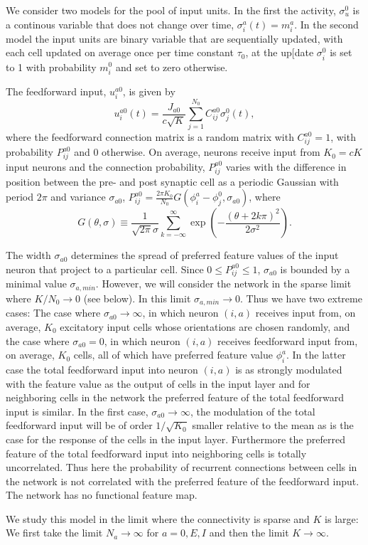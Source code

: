 We consider two models for the pool of input units. In the first the activity,
$\sigma_u^0$ is a continous variable that does not change over time, 
$\sigma_i^a(t)=m_i^a$\@. In the second model the input units are binary 
variable that are sequentially updated, with each cell updated on average once 
per time constant $\tau_0$, at the up[date $\sigma_i^0$ is set to 1 with 
probability $m_i^0$ and set to zero otherwise.

The feedforward input, $u_i^{a0}$, is given by
\begin{equation}
u_i^{a0}(t)=\frac{J_{a0}}{c\sqrt{K}}\sum_{j=1}^{N_0}C_{ij}^{a0}\sigma_j^0(t),
\end{equation}
where the feedforward connection matrix is a random matrix with $C_{ij}^{a0}=1$,
with probability $P_{ij}^{a0}$ and 0 otherwise. On average, neurons receive
input from $K_0=cK$ input neurons and the connection probability,
$P_{ij}^{a0}$ varies with the difference in position between the pre- and
post synaptic cell as a periodic Gaussian with period $2\pi$ and variance
$\sigma_{a0}$, 
$P_{ij}^{a0}=\frac{2\pi K_0}{N_0}G(\phi_i^a-\phi_j^0,\sigma_{a0})$, 
where 
\begin{equation}
G(\theta,\sigma)\equiv\frac{1}{\sqrt{2\pi}\sigma}
\sum_{k=-\infty}^{\infty}\exp\left(-\frac{(\theta+2k\pi)^2}{2\sigma^2}\right).
\end{equation}

The width $\sigma_{a0}$ determines the spread of preferred feature values of
the input neuron that project to a particular cell. Since 
$0\leq P_{ij}^{a0}\leq 1$, $\sigma_{a0}$ is bounded by a minimal value 
$\sigma_{a,min}$\@. However, we will consider the network in the sparse limit
where $K/N_0\rightarrow 0$ (see below). In this limit 
$\sigma_{a,min}\rightarrow 0$\@. Thus we have two extreme cases: The case where 
$\sigma_{a0}\rightarrow\infty$, in which neuron $(i,a)$ receives input from,
on average, $K_0$ excitatory input cells whose orientations are
chosen randomly, and the case where $\sigma_{a0}=0$, in which neuron $(i,a)$
receives feedforward input from, on average, $K_0$ cells, all of which have 
preferred feature value $\phi_i^a$\@. In the latter case the total feedforward 
input into neuron $(i,a)$ is as strongly modulated with the feature value as 
the output of cells in the input layer and for neighboring cells in the network
the preferred feature of the total feedforward input is similar. In the first 
case, $\sigma_{a0}\rightarrow\infty$, the 
modulation of the total feedforward input will be of order $1/\sqrt{K_0}$
smaller relative to the mean as is the case for the response of the 
cells in the input layer. Furthermore the preferred feature of the total 
feedforward input into neighboring cells is totally uncorrelated. Thus here 
the probability of recurrent connections between cells in the network is not 
correlated with the preferred feature of the feedforward input. The network 
has no functional feature map. 

We study this model in the limit where the connectivity is sparse and $K$ is
large: We first take the limit $N_a\rightarrow\infty$ for $a=0,E,I$ and then 
the limit $K\rightarrow \infty$\@. 

